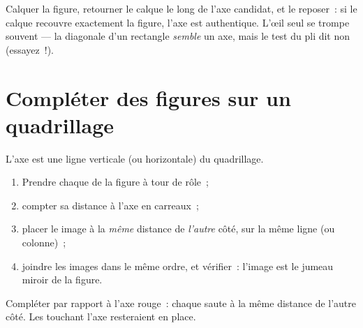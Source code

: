 \begin{example}\label{ex:g4:symmetry:trace}
Calquer la figure, retourner le calque le long de l'axe candidat, et
le reposer~: si le calque recouvre exactement la figure, l'axe est
authentique. L'œil seul se trompe souvent --- la diagonale d'un
rectangle \emph{semble} un axe, mais le test du pli dit non
(essayez~!).
\end{example}

\section{Compléter des figures sur un quadrillage}

\begin{method}\label{met:g4:symmetry:grid}
L'axe est une ligne verticale (ou horizontale) du quadrillage.
\begin{enumerate}
  \item Prendre chaque  de la figure à tour de rôle~;
  \item compter sa distance à l'axe en carreaux~;
  \item placer le  image à la \emph{même} distance de
        \emph{l'autre} côté, sur la même ligne (ou colonne)~;
  \item joindre les  images dans le même ordre, et
        vérifier~: l'image est le jumeau miroir de la figure.
\end{enumerate}
\end{method}

\begin{omfigure}

{\small Compléter par rapport à l'axe rouge~: chaque  saute à
la même distance de l'autre côté. Les  touchant l'axe
resteraient en place.}
\end{omfigure}

